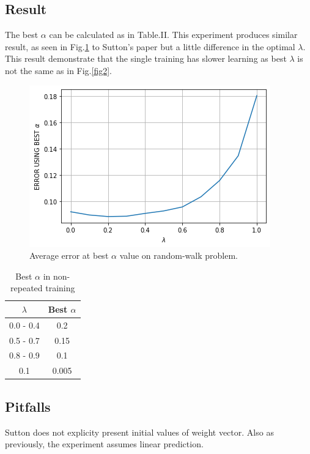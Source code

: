 \documentclass[conference]{IEEEtran}
\begin{document}
\subsection{Result}

The best $\alpha$ can be calculated as in Table.II. This experiment produces similar result, as seen in Fig.\ref{fig4} to Sutton's paper but a little difference in the optimal $\lambda$. This result demonstrate that the single training has slower learning as best $\lambda$ is not the same as in Fig.\ref{fig2}.

\begin{figure}[htbp]
\includegraphics[width=\linewidth]{output3.png}
\caption{Average error at best $\alpha$ value on random-walk problem.}
\label{fig4}
\end{figure}

\begin{table}
\begin{center}
 \begin{tabular}{||c c ||} 
 \hline
 $\lambda$ & Best $\alpha$ \\ [0.5ex] 
 \hline\hline
0.0 - 0.4  & 0.2  \\ 
 \hline
0.5 - 0.7  & 0.15  \\
 \hline
0.8 - 0.9 & 0.1  \\ [1ex]
 \hline
0.1 & 0.005  \\ [1ex]
 \hline
\end{tabular}
\end{center}
\caption{Best $\alpha$ in non-repeated training}\label{tab:2}
\end{table}

\subsection{Pitfalls}
Sutton does not explicity present initial values of weight vector. Also as previously, the experiment assumes linear prediction.
\end{document}
